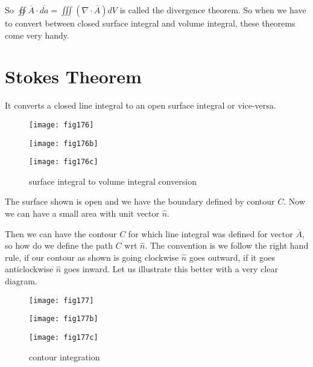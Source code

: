 So $\oiint \overline{A} \cdot \overline{da} = \iiint (\nabla \cdot \overline{A})dV$ is called the divergence theorem. So when we have to convert between closed surface integral and volume integral, these theorems come very handy.

\section{Stokes Theorem}
It converts a closed line integral to an open surface integral or vice-versa. 
\begin{figure}[htbp]
	\centering
	\begin{minipage}{.25\textwidth}
		\centering
		\texttt{[image: fig176]}
		\label{}
	\end{minipage}%
	\begin{minipage}{.25\textwidth}
		\centering
		\texttt{[image: fig176b]}
		\label{}
	\end{minipage}
	\begin{minipage}{.5\textwidth}
		\centering
		\texttt{[image: fig176c]}
		\label{}
	\end{minipage}%
	\caption{surface integral to volume integral conversion}
\end{figure}

The surface shown is open and we have the boundary defined by contour $C$. Now we can have a small area with unit vector $\hat n$.

Then we can have the contour $C$ for which line integral was defined for vector $\overline{A}$, so how do we define the path $C$ wrt $\hat n$. The convention is we follow the right hand rule, if our contour as shown is going clockwise $\hat n$ goes outward, if it goes anticlockwise $\hat n$ goes inward.\newline
Let us illustrate this better with a very clear diagram. 
\begin{figure}[htbp]
	\centering
	\begin{minipage}{.25\textwidth}
		\centering
		\texttt{[image: fig177]}
		\label{}
	\end{minipage}%
	\begin{minipage}{.25\textwidth}
		\centering
		\texttt{[image: fig177b]}
		\label{}
	\end{minipage}
	\begin{minipage}{.5\textwidth}
		\centering
		\texttt{[image: fig177c]}
		\label{}
	\end{minipage}%
	\caption{contour integration}
\end{figure}

